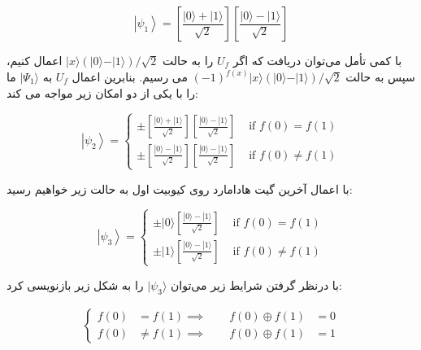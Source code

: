 \documentclass{book}
\begin{document}
\begin{center}
	\begin{equation}\label{first psi1 deutsch algorithm}
		\left|\psi_1\right\rangle=\left[\frac{|0\rangle+|1\rangle}{\sqrt{2}}\right]\left[\frac{|0\rangle-|1\rangle}{\sqrt{2}}\right]
	\end{equation}
\end{center}
با کمی تأمل می‌توان دریافت که اگر $U_{f}$ را به حالت $\vert x \rangle (\vert 0 \rangle - \vert 1 \rangle)/\sqrt{2}$ اعمال کنیم، سپس به حالت $(-1)^{f(x)}\vert x \rangle(\vert 0 \rangle - \vert 1 \rangle)/\sqrt{2}$ می رسیم. بنابرین اعمال $U_{f}$ به $\vert \Psi_{1} \rangle$ ما را با یکی از دو امکان زیر مواجه می کند:
\begin{center}
	\begin{equation}\label{first psi2 deutsch algorithm}
	\left|\psi_2\right\rangle= \begin{cases} \pm\left[\frac{|0\rangle+|1\rangle}{\sqrt{2}}\right]\left[\frac{|0\rangle-|1\rangle}{\sqrt{2}}\right] & \text { if } f(0)=f(1) \\ \pm\left[\frac{|0\rangle-|1\rangle}{\sqrt{2}}\right]\left[\frac{|0\rangle-|1\rangle}{\sqrt{2}}\right] & \text { if } f(0) \neq f(1) \end{cases}
\end{equation}
\end{center}
با اعمال آخرین گیت هادامارد روی کیوبیت اول به حالت زیر خواهیم رسید:
\begin{center}
	\begin{equation}\label{first psi3 deutsch algorithm}
	\left|\psi_3\right\rangle= \begin{cases} \pm|0\rangle\left[\frac{|0\rangle-|1\rangle}{\sqrt{2}}\right] & \text { if } f(0)=f(1) \\ \pm|1\rangle\left[\frac{|0\rangle-|1\rangle}{\sqrt{2}}\right] & \text { if } f(0) \neq f(1) \end{cases}
	\end{equation}
\end{center}
با درنظر گرفتن شرایط زیر می‌توان $\vert\psi_{3}\rangle$ را به شکل زیر بازنویسی کرد:
\begin{center}
\begin{equation}\label{constantorbalanse}
	\begin{aligned}
		\left\{
		\begin{aligned}
			f(0) &= f(1) 
			\implies \qquad f(0) \oplus f(1) &= 0\\
			f(0) &\neq f(1) 
			\implies \qquad f(0) \oplus f(1) &= 1
		\end{aligned}
		\right.
	\end{aligned}
\end{equation}
\end{center}
\end{document}
